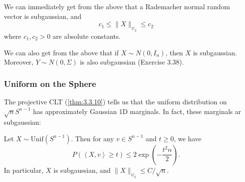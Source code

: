 \begin{example}[Rademacher]
\label{ex:3.4.3}
We can immediately get from the above that a Rademacher normal random vector is subgaussian, and 
\[ c_1 \leq \lVert X \rVert_{\psi_2} \leq c_2 \]
where $c_1, c_2 > 0$ are absolute constants.
\end{example}

\begin{example}[Normal]
\label{ex:3.4.4}
We can also get from the above that if $X \sim N(0, I_n)$, then $X$ is subgaussian. Moreover, 
$Y \sim N(0, \Sigma)$ is also subgaussian (Exercise 3.38).
\end{example}

\subsubsection{Uniform on the Sphere}
The projective CLT (\cref{thm:3.3.10}) tells us that the uniform distribution on $\sqrt{n}S^{n - 1}$ has 
approximately Gaussian 1D marginals. In fact, these marginals ar subgaussian:

\begin{theorem}[Name]
\label{thm:3.4.5}
Let $X \sim \mathrm{Unif}(S^{n - 1})$. Then for any $v \in S^{n - 1}$ and $t \geq 0$, we have 
\[ P(\left\langle X, v \right\rangle \geq t) \leq 2\exp{\left( -\frac{t^2 n}{2} \right)}. \]
In particular, $X$ is subgaussian, and $\lVert X \rVert_{\psi_2} \leq C / \sqrt{n}$.
\end{theorem}

